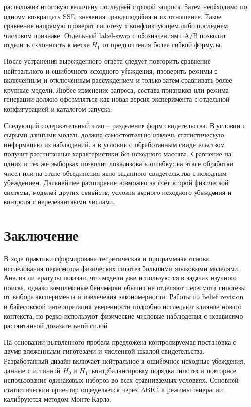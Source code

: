 \documentclass[a4paper,14pt]{extarticle}
\newcommand{\Hnull}{\ensuremath{H_0}}
\newcommand{\Hone}{\ensuremath{H_1}}
\newcommand{\DeltaBIC}{\ensuremath{\Delta\mathrm{BIC}}}
\begin{document}
расположив итоговую величину последней строкой запроса. Затем необходимо по одному возвращать SSE, значения правдоподобия и их отношение. Такое сравнение напрямую проверит гипотезу о конфликтующем либо последнем числовом признаке. Отдельный label-swap с обозначениями A/B позволит отделить склонность к метке \Hone{} от предпочтения более гибкой формулы.

После устранения вырожденного ответа следует повторить сравнение нейтрального и ошибочного исходного убеждения, проверить режимы с включённым и отключённым рассуждением и только затем сравнивать более крупные модели. Любое изменение запроса, состава признаков или режима генерации должно оформляться как новая версия эксперимента с отдельной конфигурацией и каталогом запуска.

Следующий содержательный этап -- разделение форм свидетельства. В условии с сырыми данными модель должна самостоятельно извлечь статистическую информацию из наблюдений, а в условии с обработанным свидетельством получит рассчитанные характеристики без исходного массива. Сравнение на одних и тех же выборках позволит локализовать ошибку: на этапе обработки чисел или на этапе объединения явно заданного свидетельства с исходным убеждением. Дальнейшее расширение возможно за счёт второй физической системы, моделей других семейств, условия верного исходного убеждения и контроля с нерелевантными числами.

\section{Заключение}

В ходе практики сформирована теоретическая и программная основа исследования пересмотра физических гипотез большими языковыми моделями. Анализ литературы показал, что модели уже используются в задачах научного поиска, однако комплексные бенчмарки обычно не отделяют пересмотр гипотезы от выбора эксперимента и извлечения закономерности. Работы по belief revision и байесовской интерпретации уверенности подробно исследуют влияние нового контекста, но редко используют физические числовые наблюдения с независимо рассчитанной доказательной силой.

На основании выявленного пробела предложена контролируемая постановка с двумя вложенными гипотезами и численной шкалой свидетельства. Разработанный дизайн включает нейтральное и ошибочное исходные убеждения, данные с истинной \Hnull{} и \Hone, контрбалансировку порядка гипотез и повторное использование одинаковых наборов во всех сравниваемых условиях. Основной статистический ориентир определяется через \DeltaBIC, а режимы генерации калибруются методом Монте-Карло.
\end{document}
